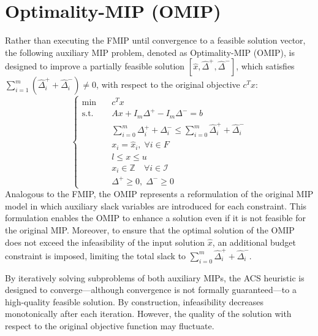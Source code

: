 \section{Optimality-MIP (OMIP)}
Rather than executing the FMIP until convergence to a feasible solution vector, the following auxiliary MIP problem, denoted as Optimality-MIP (OMIP), is designed to improve a partially feasible solution $[\hat{x}, \hat{\Delta}^+, \hat{\Delta}^-]$, which satisfies $\sum_{i=1}^m (\hat{\Delta}_i^+ + \hat{\Delta}_i^-) \neq 0$, with respect to the original objective $c^T x$:
\begin{equation}
\begin{cases}
\text{min} \quad & c^T x \\ \text{s.t.} \quad & Ax + I_m\Delta^+ - I_m\Delta^- = b\\ & \sum_{i=0}^m \Delta_i^{+}+\Delta_i^{-} \le \sum_{i=0}^m \hat\Delta_i^{+}+\hat\Delta_i^{-}\\ & x_i = \hat{x}_i, \; \forall i \in F\\ & l \le x \le u\\ & x_i \in \mathbb{Z} \quad \forall i \in \mathcal{I} \\ & \Delta^+ \ge 0, \; \Delta^- \ge 0 
\end{cases}
\end{equation}
Analogous to the FMIP, the OMIP represents a reformulation of the original MIP model in which auxiliary slack variables are introduced for each constraint. This formulation enables the OMIP to enhance a solution even if it is not feasible for the original MIP. Moreover, to ensure that the optimal solution of the OMIP does not exceed the infeasibility of the input solution $\hat{x}$, an additional budget constraint is imposed, limiting the total slack to $\sum_{i=0}^m \hat\Delta_i^{+}+\hat\Delta_i^{-}$.

By iteratively solving subproblems of both auxiliary MIPs, the ACS heuristic is designed to converge—although convergence is not formally guaranteed—to a high-quality feasible solution. By construction, infeasibility decreases monotonically after each iteration. However, the quality of the solution with respect to the original objective function may fluctuate.

